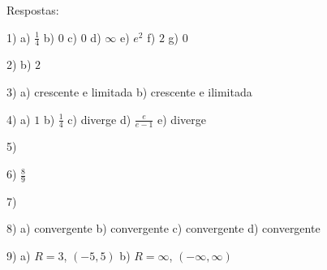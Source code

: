 \documentclass{article}
\begin{document}
Respostas:

1) a) $\frac{1}{4}$ b) $0$ c) $0$ d) $\infty$ e) $e^2$ f) $2$ g) $0$

2) b) $2$

3) a) crescente e limitada b) crescente e ilimitada

4) a) $1$ b) $\frac{1}{4}$ c) diverge d) $\frac{e}{e-1}$ e) diverge

5)

6) $\frac{8}{9}$

7) 

8) a) convergente b) convergente c) convergente d) convergente

9) a) $R=3$, $(-5, 5)$ b) $R=\infty$, $(-\infty, \infty)$
\end{document}

